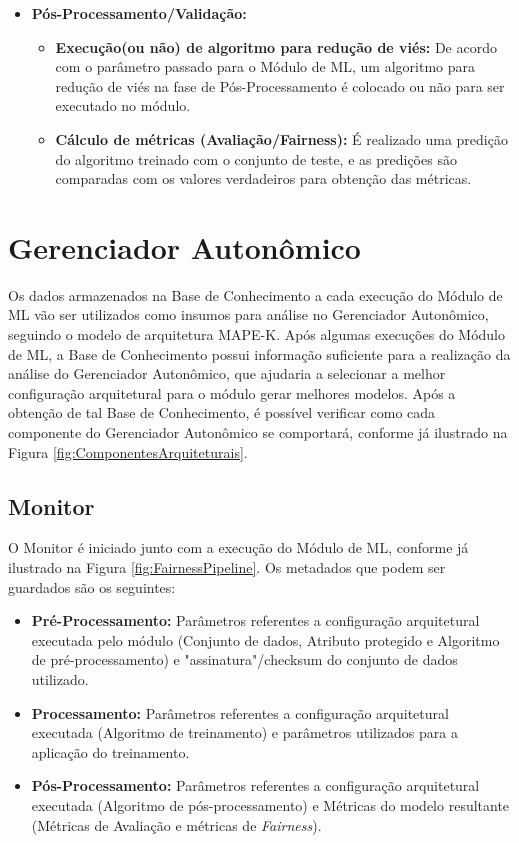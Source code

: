 \documentclass[Portugues,Final]{ic-tese-v3}
\begin{document}
\begin{itemize}
\begin{itemize}
	\end{itemize}
\item \textbf{Pós-Processamento/Validação:}
	\begin{itemize}
	\item \textbf{Execução(ou não) de algoritmo para redução de viés:} De acordo com o parâmetro passado para o Módulo de ML, um algoritmo para redução de viés na fase de Pós-Processamento é colocado ou não para ser executado no módulo.
	\item \textbf{Cálculo de métricas (Avaliação/Fairness):} É realizado uma predição do algoritmo treinado com o conjunto de teste, e as predições são comparadas com os valores verdadeiros para obtenção das métricas.
	\end{itemize}
\end{itemize}

\section{Gerenciador Autonômico}
\label{sec:GerenciadorAutonomico}

Os dados armazenados na Base de Conhecimento a cada execução do Módulo de ML vão ser utilizados como insumos para análise no Gerenciador Autonômico, seguindo o modelo de arquitetura MAPE-K. Após algumas execuções do Módulo de ML, a Base de Conhecimento possui informação suficiente para a realização da análise do Gerenciador Autonômico, que ajudaria a selecionar a melhor configuração arquitetural para o módulo gerar melhores modelos. Após a obtenção de tal Base de Conhecimento, é possível verificar como cada componente do Gerenciador Autonômico se comportará, conforme já ilustrado na Figura \ref{fig:ComponentesArquiteturais}.

\subsection{Monitor}

O Monitor é iniciado junto com a execução do Módulo de ML, conforme já ilustrado na Figura \ref{fig:FairnessPipeline}. Os metadados que podem ser guardados são os seguintes:

\begin{itemize}
\item \textbf{Pré-Processamento:} Parâmetros referentes a configuração arquitetural executada pelo módulo (Conjunto de dados, Atributo protegido e Algoritmo de pré-processamento) e "assinatura"/checksum do conjunto de dados utilizado.
\item \textbf{Processamento:} Parâmetros referentes a configuração arquitetural executada (Algoritmo de treinamento) e parâmetros utilizados para a aplicação do treinamento.
\item \textbf{Pós-Processamento:} Parâmetros referentes a configuração arquitetural executada (Algoritmo de pós-processamento) e Métricas do modelo resultante (Métricas de Avaliação e métricas de \textit{Fairness}).
\end{itemize}
\end{document}

